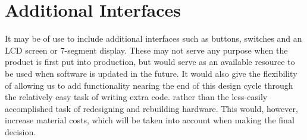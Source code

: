 \section{Additional Interfaces}
It may be of use to include additional interfaces such as buttons, switches and an LCD screen or 7-segment display. These may not serve any purpose when the product is first put into production, but would serve as an available resource to be used when software is updated in the future. It would also give the flexibility of allowing us to add functionality nearing the end of this design cycle through the relatively easy task of writing extra code. rather than the less-easily accomplished task of redesigning and rebuilding hardware. This would, however, increase material costs, which will be taken into account when making the final decision. 








